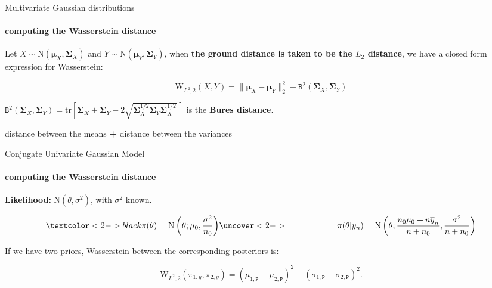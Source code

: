 \documentclass[9 pt]{beamer}
\begin{document}
\begin{frame}{Multivariate Gaussian distributions}
\framesubtitle{computing the Wasserstein distance}
Let $X \sim \text{N}(\boldsymbol{\mu}_{X}, \boldsymbol{\Sigma}_{X})$ and $Y \sim \text{N}(\boldsymbol{\mu}_{Y}, \boldsymbol{\Sigma}_{Y})$, when \textcolor{light}{\bf the ground distance is taken to be the $L_2$ distance}, we have a closed form expression for Wasserstein:
\vspace{0.25cm}

\[\text{W}_{L^2,2}(X,Y)  = \| \boldsymbol{\mu}_{X} - \boldsymbol{\mu}_{Y} \|_{2}^{2} + \mathtt{B}^{2}(\boldsymbol{\Sigma}_{X}, \boldsymbol{\Sigma}_{Y}) \]

\vspace{0.7cm}

\pause 
$\mathtt{B}^{2}(\boldsymbol{\Sigma}_{X}, \boldsymbol{\Sigma}_{Y}) = \text{tr}\left[\boldsymbol{\Sigma}_{X} + \boldsymbol{\Sigma}_{Y} - 2\sqrt{\boldsymbol{\Sigma}_{X}^{1/2}\boldsymbol{\Sigma}_{Y}\boldsymbol{\Sigma}_{X}^{1/2}}\,\right]$ is the \textbf{ \color{light} Bures distance}.

\vspace{.8cm}

 \pause

\begin{exampleblock}

\begin{center}
    distance between the means \textbf{+} distance between the variances
\end{center}

\end{exampleblock}
 
 \end{frame}
 
 \begin{frame}{Conjugate Univariate Gaussian Model}
\framesubtitle{computing the Wasserstein distance}

\textbf{Likelihood:} $\text{N}(\theta, \sigma^2)$, with $\sigma^2$ known.


\[ \textcolor<2->{black}{
\pi(\theta) =  \text{N}\left(\theta; \mu_0, \frac{\sigma^2}{n_0}\right)} 
\uncover<2-> {
\qquad \qquad \qquad 
\pi(\theta |y_n) = \text{N}\left(\theta; \frac{n_{0}\mu_{0} + n\overline{y}_{n}}{n + n_{0}}, \frac{\sigma^{2}}{n + n_{0}}\right)}\]

\pause
\pause

\vspace{0.5cm}
If we have two priors, Wasserstein between the corresponding posteriors is:

\vspace{0.35cm}


\begin{exampleblock}

\[
\text{W}_{L^2, 2}(\pi_{1,y} , \pi_{2,y})  = \left(\mu_{1,\mathtt{P}} - \mu_{2,\mathtt{P}}\right)^{2} + \left(\sigma_{1,\mathtt{P}} - \sigma_{2,\mathtt{P}}\right)^{2}.
\]
\end{exampleblock}

\end{frame}
\end{document}
